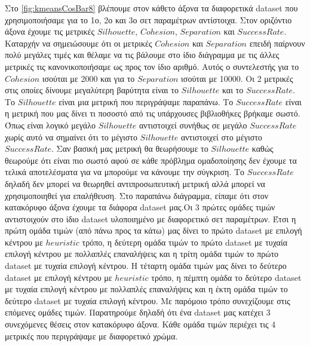Στο \hyperref[fig:kmeansCosBar8]{\figurename{} \ref{fig:kmeansCosBar8}}
βλέπουμε στον κάθετο άξονα τα διαφορετικά dataset που χρησιμοποιήσαμε για το 1ο, 2ο και 3ο σετ παραμέτρων αντίστοιχα. Στον οριζόντιο άξονα έχουμε τις μετρικές $Silhouette$, $Cohesion$, $Separation$ και $Success Rate$. Καταρχήν να σημειώσουμε ότι οι μετρικές $Cohesion$ και $Separation$ επειδή παίρνουν πολύ μεγάλες τιμές και θέλαμε να τις βάλουμε στο ίδιο διάγραμμα με τις άλλες μετρικές τις κανονικοποιήσαμε ως προς τον ίδιο αριθμό. Αυτός ο συντελεστής για το $Cohesion$ ισούται με 2000 και για το $Separation$ ισούται με 10000.
Οι 2 μετρικές στις οποίες δίνουμε μεγαλύτερη βαρύτητα είναι το $Silhouette$ και το $Success Rate$. Το $Silhouette$ είναι μια μετρική που περιγράψαμε παραπάνω. Το $Success Rate$ είναι η μετρική που μας δίνει τι ποσοστό από τις υπάρχουσες βιβλιοθήκες βρήκαμε σωστό. Όπως είναι λογικό μεγάλο $Silhouette$ αντιστοιχεί συνήθως σε μεγάλο $Success Rate$ χωρίς αυτό να σημαίνει ότι το μέγιστο $Silhouette$ αντιστοιχεί στο μέγιστο $Success Rate$. Σαν βασική μας μετρική θα θεωρήσουμε το $Silhouette$ καθώς θεωρούμε ότι είναι πιο σωστό αφού σε κάθε πρόβλημα ομαδοποίησης δεν έχουμε τα τελικά αποτελέσματα για να μπορούμε να κάνουμε την σύγκριση. Το $Success Rate$ δηλαδή δεν μπορεί να θεωρηθεί αντιπροσωπευτική μετρική αλλά μπορεί να χρησιμοποιηθεί για επαλήθευση.
Στο παραπάνω διάγραμμα, είπαμε ότι στον κατακόρυφο άξονα έχουμε τα διάφορα dataset μας.Οι 3 πρώτες ομάδες τιμών αντιστοιχούν στο ίδιο dataset υλοποιημένο με διαφορετικό σετ παραμέτρων. Έτσι η πρώτη ομάδα τιμών (από πάνω προς τα κάτω) μας δίνει το πρώτο dataset με επιλογή κέντρου με $heuristic$ τρόπο, η δεύτερη ομάδα τιμών το πρώτο dataset με τυχαία επιλογή κέντρου με πολλαπλές επαναλήψεις και η τρίτη ομάδα τιμών το πρώτο dataset με τυχαία επιλογή κέντρου. Η τέταρτη ομάδα τιμών μας δίνει το δεύτερο dataset με επιλογή κέντρου με $heuristic$ τρόπο, η πέμπτη ομάδα το δεύτερο dataset  με τυχαία επιλογή κέντρου με πολλαπλές επαναλήψεις και η έκτη ομάδα τιμών το δεύτερο dataset με τυχαία επιλογή κέντρου. Με παρόμοιο τρόπο συνεχίζουμε στις επόμενες ομάδες τιμών. Παρατηρούμε δηλαδή ότι ένα dataset μας κατέχει 3 συνεχόμενες θέσεις στον κατακόρυφο άξονα.
Κάθε ομάδα τιμών περιέχει τις 4 μετρικές που περιγράψαμε με διαφορετικό χρώμα.

